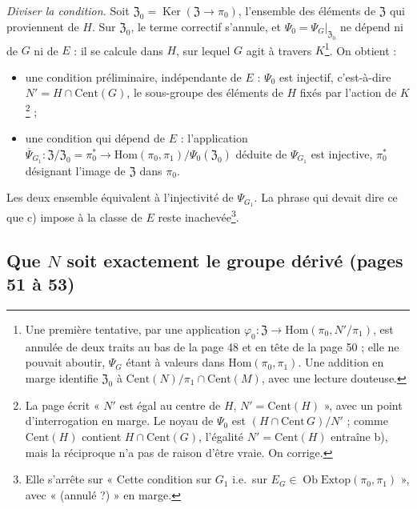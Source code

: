 \documentclass[11pt,a4paper]{article}
\begin{document}
\emph{Diviser la condition.} Soit $\mathfrak{Z}_0 = \operatorname{Ker}(\mathfrak{Z}
\to \pi_0)$, l'ensemble des éléments de $\mathfrak{Z}$ qui proviennent de
$H$. Sur $\mathfrak{Z}_0$, le terme correctif s'annule, et $\Psi_0 =
\Psi_G|_{\mathfrak{Z}_0}$ ne dépend ni de $G$ ni de $E$ : il se calcule dans
$H$, sur lequel $G$ agit à travers $K$\footnote{Une première tentative, par
une application $\varphi_0 \colon \mathfrak{Z} \to \mathrm{Hom}(\pi_0,
N'/\pi_1)$, est annulée de deux traits au bas de la page 48 et en tête de la
page 50 ; elle ne pouvait aboutir, $\Psi_G$ étant à valeurs dans
$\mathrm{Hom}(\pi_0, \pi_1)$. Une addition en marge identifie
$\mathfrak{Z}_0$ à $\mathrm{Cent}(N)/\pi_1 \cap \mathrm{Cent}(M)$, avec une
lecture douteuse.}. On obtient :
\begin{itemize}
  \item[b)] une condition préliminaire, indépendante de $E$ : $\Psi_0$ est
  injectif, c'est-à-dire $N' = H \cap \mathrm{Cent}(G)$, le sous-groupe des
  éléments de $H$ fixés par l'action de $K$\footnote{La page écrit « $N'$
  est égal au centre de $H$, $N' = \mathrm{Cent}(H)$ », avec un point
  d'interrogation en marge. Le noyau de $\Psi_0$ est
  $(H \cap \mathrm{Cent}\,G)/N'$ ; comme $\mathrm{Cent}(H)$ contient
  $H \cap \mathrm{Cent}(G)$, l'égalité $N' = \mathrm{Cent}(H)$ entraîne b),
  mais la réciproque n'a pas de raison d'être vraie. On corrige.} ;
  \item[c)] une condition qui dépend de $E$ : l'application
  $\overline{\Psi}_{G_1} \colon \mathfrak{Z}/\mathfrak{Z}_0 = \pi_0^{*} \to
  \mathrm{Hom}(\pi_0, \pi_1)/\Psi_0(\mathfrak{Z}_0)$ déduite de
  $\Psi_{G_1}$ est injective, $\pi_0^{*}$ désignant l'image de
  $\mathfrak{Z}$ dans $\pi_0$.
\end{itemize}
Les deux ensemble équivalent à l'injectivité de $\Psi_{G_1}$. La phrase qui
devait dire ce que c) impose à la classe de $E$ reste
inachevée\footnote{Elle s'arrête sur « Cette condition sur $G_1$ i.e.\ sur
$E_G \in \operatorname{Ob}\mathrm{Extop}(\pi_0, \pi_1)$ », avec « (annulé ?) » en marge.}.

\subsection*{Que $N$ soit exactement le groupe dérivé (pages 51 à 53)}
\end{document}
